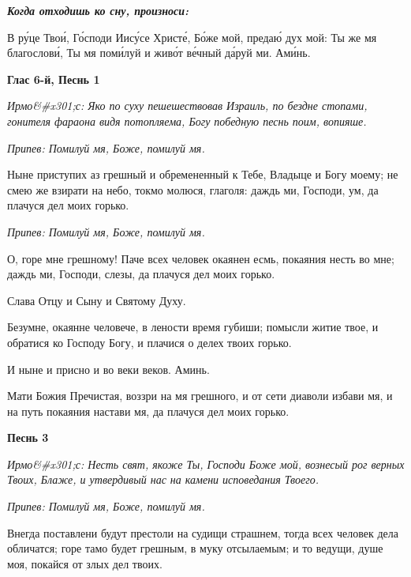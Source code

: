 \bfseries  \itshape Когда отходишь ко сну, произноси:\normalfont{}\normalfont{}


   В ру́це Твои́, Го́споди Иису́се Христе́, Бо́же мой, предаю́ дух мой:
Ты же мя благослови́, Ты мя поми́луй и живо́т ве́чный да́руй ми.
Ами́нь.

   


\mychapterending





\bfseries Глас 6-й, Песнь 1\normalfont{}


\itshape Ирмо&#x301;с:\normalfont{} Яко по суху пешешествовав Израиль, по бездне стопами, гонителя фараона видя потопляема, Богу победную песнь поим, вопияше.


\itshape Припев:\normalfont{} Помилуй мя, Боже, помилуй мя.


Ныне приступих аз грешный и обремененный к Тебе, Владыце и Богу моему; не смею же взирати на небо, токмо молюся, глаголя: даждь ми, Господи, ум, да плачуся дел моих горько.


\itshape Припев:\normalfont{} Помилуй мя, Боже, помилуй мя.


О, горе мне грешному! Паче всех человек окаянен есмь, покаяния несть во мне; даждь ми, Господи, слезы, да плачуся дел моих горько.


Слава Отцу и Сыну и Святому Духу.


Безумне, окаянне человече, в лености время губиши; помысли житие твое, и обратися ко Господу Богу, и плачися о делех твоих горько.


И ныне и присно и во веки веков. Аминь.


Мати Божия Пречистая, воззри на мя грешного, и от сети диаволи избави мя, и на путь покаяния настави мя, да плачуся дел моих горько.




\bfseries Песнь 3\normalfont{}


\itshape Ирмо&#x301;с:\normalfont{} Несть свят, якоже Ты, Господи Боже мой, вознесый рог верных Твоих, Блаже, и утвердивый нас на камени исповедания Твоего.


\itshape Припев:\normalfont{} Помилуй мя, Боже, помилуй мя.


Внегда поставлени будут престоли на судищи страшнем, тогда всех человек дела обличатся; горе тамо будет грешным, в муку отсылаемым; и то ведущи, душе моя, покайся от злых дел твоих.



